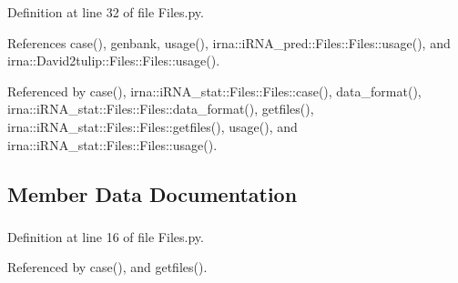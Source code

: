 \-Definition at line 32 of file \-Files.\-py.



\-References case(), genbank, usage(), irna\-::i\-R\-N\-A\-\_\-pred\-::\-Files\-::\-Files\-::usage(), and irna\-::\-David2tulip\-::\-Files\-::\-Files\-::usage().



\-Referenced by case(), irna\-::i\-R\-N\-A\-\_\-stat\-::\-Files\-::\-Files\-::case(), data\-\_\-format(), irna\-::i\-R\-N\-A\-\_\-stat\-::\-Files\-::\-Files\-::data\-\_\-format(), getfiles(), irna\-::i\-R\-N\-A\-\_\-stat\-::\-Files\-::\-Files\-::getfiles(), usage(), and irna\-::i\-R\-N\-A\-\_\-stat\-::\-Files\-::\-Files\-::usage().



\subsection{\-Member \-Data \-Documentation}
\hypertarget{classirna_1_1iRNA__seq_1_1Files_1_1Files_afdd7451b251f5d536947551dd4c22ef8}{
\subsubsection[{begin}]{}}
\label{classirna_1_1iRNA__seq_1_1Files_1_1Files_afdd7451b251f5d536947551dd4c22ef8}


\-Definition at line 16 of file \-Files.\-py.



\-Referenced by case(), and getfiles().

\hypertarget{classirna_1_1iRNA__seq_1_1Files_1_1Files_adc60e8bb5cb8cd883183912dd23fdedf}{
\subsubsection[{complete}]{}}
\label{classirna_1_1iRNA__seq_1_1Files_1_1Files_adc60e8bb5cb8cd883183912dd23fdedf}


